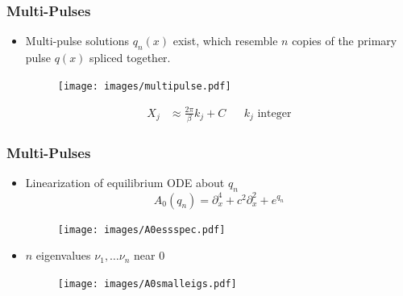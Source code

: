 \documentclass[16pt]{beamer}
\begin{document}
\begin{frame}
\frametitle{Multi-Pulses}   
    \begin{theorem}
    \begin{itemize}
    \item Multi-pulse solutions $q_n(x)$ exist, which resemble $n$ copies of the primary pulse $q(x)$ spliced together.

	\begin{figure}
	\begin{center}
	\texttt{[image: images/multipulse.pdf]}
	\end{center}
	\end{figure}
	\begin{align*}
	 X_j &\approx \frac{2 \pi}{\beta} k_j + C && k_j \text{ integer}
	\end{align*}
	\end{itemize}
    \end{theorem}
\end{frame}

\begin{frame}
\frametitle{Multi-Pulses}   
    \begin{theorem}
    \begin{itemize}
    	\item Linearization of equilibrium ODE about $q_n$ 
    	\[
    	A_0(q_n) = \partial_x^4 + c^2 \partial_x^2 + e^{q_n} 
    	\]
    	\begin{figure}
		\begin{center}
		\texttt{[image: images/A0essspec.pdf]}
		\end{center}
		\end{figure}

    	\item $n$ eigenvalues $\nu_1, \dots \nu_n$ near 0

        \begin{figure}
		\begin{center}
		\texttt{[image: images/A0smalleigs.pdf]}
		\end{center}
		\end{figure}
    \end{itemize}
    \end{theorem}
\end{frame}
\end{document}
